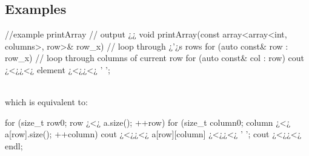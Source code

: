 \subsection{Examples}

\begin{minipage}{\MPWxLARGExLISTING\textwidth} %
{} %
\begin{CPPCode}
//example printArray
// output ¿¿
void printArray(const array<array<int, columns>, row>& row_x)
{
    // loop through ¿'¿s rows
    for (auto const& row : row_x)
    {
        // loop through columns of current row
        for (auto const& col : row)
        {
            cout ¿<¿¿<¿ element ¿<¿¿<¿ ' ';
        }
    }
}
\end{CPPCode}
\end{minipage}
\\
which is equivalent to:\\
\begin{minipage}{\MPWxLARGExLISTING\textwidth} %
{} %
\begin{CPPCode}
for (size_t row{0}; row ¿<¿ a.size(); ++row) 
{
    for (size_t column{0}; column ¿<¿ a[row].size(); ++column)
    {
        cout ¿<¿¿<¿ a[row][column] ¿<¿¿<¿ ' ';
    }
    cout ¿<¿¿<¿ endl;
}
\end{CPPCode}
\end{minipage}
\\



    
